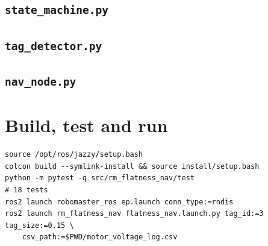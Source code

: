 \documentclass[11pt,a4paper]{article}
\begin{document}
\subsection*{\texttt{state\_machine.py}}
{}
\subsection*{\texttt{tag\_detector.py}}
{}
\subsection*{\texttt{nav\_node.py}}
{}

\section{Build, test and run}
\begin{Verbatim}[fontsize=\footnotesize]
source /opt/ros/jazzy/setup.bash
colcon build --symlink-install && source install/setup.bash
python -m pytest -q src/rm_flatness_nav/test                           # 18 tests
ros2 launch robomaster_ros ep.launch conn_type:=rndis
ros2 launch rm_flatness_nav flatness_nav.launch.py tag_id:=3 tag_size:=0.15 \
    csv_path:=$PWD/motor_voltage_log.csv
\end{Verbatim}
\end{document}
